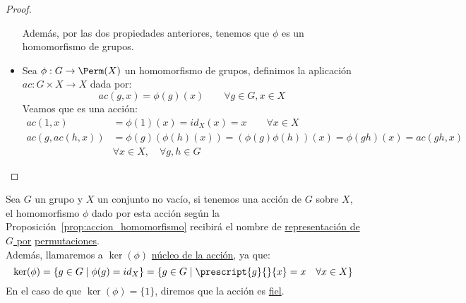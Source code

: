 \begin{prop}
\begin{proof}
\begin{itemize}
                \noindent
                Además, por las dos propiedades anteriores, tenemos que $\phi$ es un homomorfismo de grupos.
            \item Sea $\phi:G\to \Perm(X)$ un homomorfismo de grupos, definimos la aplicación $ac:G\times X \to X$ dada por:
                \begin{equation*}
                    ac(g,x) = \phi(g)(x) \qquad \forall g\in G, x\in X
                \end{equation*}
                Veamos que es una acción:
                \begin{align*}
                    ac(1,x) &= \phi(1)(x) = id_X(x) = x \qquad \forall x\in X \\
                    ac(g,ac(h,x)) &= \phi(g)(\phi(h)(x)) = (\phi(g)\phi(h))(x) = \phi(gh)(x) = ac(gh,x)  \\ &\forall x\in X, \quad \forall g,h\in G
                \end{align*} \qedhere
        \end{itemize}
    \end{proof}
\end{prop}

\begin{definicion}
    Sea $G$ un grupo y $X$ un conjunto no vacío, si tenemos una acción de $G$ sobre $X$, el homomorfismo $\phi$ dado por esta acción según la Proposición~\ref{prop:accion_homomorfismo} recibirá el nombre de \underline{representación de $G$ por} \underline{permutaciones}.\\

    \noindent
    Además, llamaremos a $\ker(\phi)$ \underline{núcleo de la acción}, ya que:
    \begin{equation*}
        \ker(\phi) = \{g\in G \mid \phi(g) = id_X\} = \{g\in G \mid \prescript{g}{}{x} = x \quad \forall x\in X\}
    \end{equation*}
    En el caso de que $\ker(\phi) = \{1\}$, diremos que la acción es \underline{fiel}.
\end{definicion}

